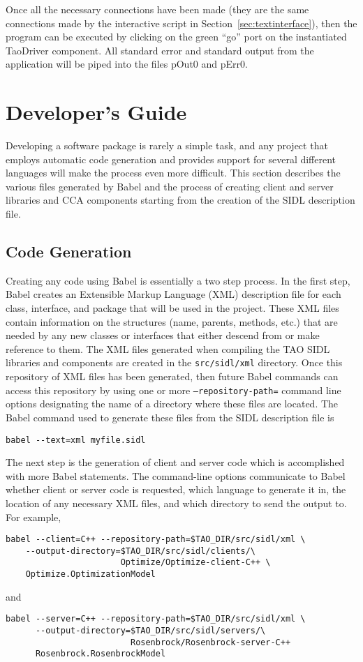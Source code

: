 \documentclass[doublespacing,12pt]{article}
\begin{document}
Once all the necessary connections have been made (they are the same
connections made by the interactive script in
Section~\ref{sec:textinterface}), then the program can be executed by
clicking on the green ``go'' port on the instantiated \textsf{TaoDriver}
component.  All standard error and standard output from the
application will be piped into the files pOut0 and pErr0.


\section{Developer's Guide}
Developing a software package is rarely a simple task, and any project that 
employs automatic code generation and provides support for several different
languages will
make the process even more difficult.  This section describes the 
various files generated by Babel and the process of creating client
and server libraries 
and CCA components starting from the creation of the SIDL description file.

\subsection{Code Generation}\label{sec:codeGeneration}
Creating any code using Babel is essentially a two step process.  In the first
step, Babel creates an Extensible Markup Language (XML) description file for 
each class, interface, and package that will be used in the project.  
These XML files contain information on the 
structures (name, parents, methods, etc.) that are needed by any new classes or
interfaces that either descend from or make reference to them.  The XML files 
generated when compiling the TAO SIDL libraries and components are created in 
the \texttt{src/sidl/xml} directory.  
Once this repository of XML files has been 
generated, then future Babel commands
can access this repository by using one or more \texttt{--repository-path=} 
command line options 
designating the name of a directory where these files are located.
The Babel command used to generate these files 
from the SIDL description file is
\begin{verbatim}
babel --text=xml myfile.sidl
\end{verbatim}

The next step is the generation of client and server code which is 
accomplished with more Babel statements.  The command-line options communicate
to Babel whether client or server code is requested, which language
to generate it in, the location of any necessary XML files, and which
directory to send the output to.  For example,
\begin{verbatim}
babel --client=C++ --repository-path=$TAO_DIR/src/sidl/xml \  
    --output-directory=$TAO_DIR/src/sidl/clients/\
                       Optimize/Optimize-client-C++ \
    Optimize.OptimizationModel
\end{verbatim}
and
\begin{verbatim}
babel --server=C++ --repository-path=$TAO_DIR/src/sidl/xml \
      --output-directory=$TAO_DIR/src/sidl/servers/\
                         Rosenbrock/Rosenbrock-server-C++ 
      Rosenbrock.RosenbrockModel
\end{verbatim}
\end{document}
